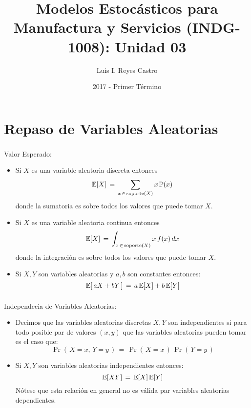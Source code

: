 \documentclass[ 10pt, xcolor = dvipsnames]{beamer}
\title[\shorttitle]{Modelos Estoc\'asticos para Manufactura y Servicios (INDG-1008): \textbf{Unidad 03} }
\author[L. I. Reyes Castro]{Luis I. Reyes Castro}
\institute[ESPOL]{\normalsize Escuela Superior Polit\'ecnica del Litoral (ESPOL) \\ Guayaquil - Ecuador}
\date[2017-T1]{2017 - Primer T\'ermino}
\begin{document}



\section{Repaso de Variables Aleatorias}

\begin{frame}[allowframebreaks]
\frametitle{\insertsection}

Valor Esperado: 
\begin{itemize}
\item Si $X$ es una variable aleatoria discreta entonces 
\[
\mathbb{E}[X] \, = \, \sum_{ x \, \in \, \text{soporte}(X) } x \, \mathbb{P}(x)
\]
donde la sumatoria es sobre todos los valores que puede tomar $X$. 
\item Si $X$ es una variable aleatoria continua entonces 
\[
\mathbb{E}[X] \, = \, \int_{ x \, \in \, \text{soporte}(X) } x \, f(x) \, dx
\]
donde la integraci\'on es sobre todos los valores que puede tomar $X$. 
\item Si $X,Y$ son variables aleatorias y $a,b$ son constantes entonces: 
\[
\mathbb{E}[ \, a X + b Y \, ] \, = \, a \, \mathbb{E}[X] + b \, \mathbb{E}[Y]
\]
\end{itemize}

\end{frame}

\begin{frame}[allowframebreaks]
\frametitle{\insertsection}

Independecia de Variables Aleatorias: 
\begin{itemize}
\item Decimos que las variables aleatorias discretas $X,Y$ son independientes si \linebreak para todo posible par de valores $(x,y)$ que las variables aleatorias \linebreak pueden tomar es el caso que: 
\[
\Pr( \, X = x, \, Y = y \, ) \, = \,
\Pr( \, X = x \, ) \, \Pr( \, Y = y \, )
\]
\item Si $X,Y$ son variables aleatorias independientes entonces: 
\[
\mathbb{E}[XY] \, = \, \mathbb{E}[X] \, \mathbb{E}[Y]
\]
N\'otese que esta relaci\'on en general no es v\'alida par variables aleatorias dependientes. 
\end{itemize}

\end{frame}
\end{document}

